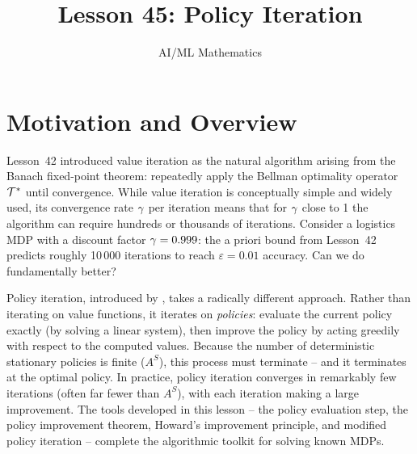 \documentclass[11pt,a4paper]{article}
\title{Lesson 45: Policy Iteration}
\author{AI/ML Mathematics}
\date{}
\begin{document}
\maketitle
\tableofcontents
\newpage


\section{Motivation and Overview}
\label{sec:motivation}

Lesson~42 introduced value iteration as the natural algorithm arising
from the Banach fixed-point theorem: repeatedly apply the Bellman
optimality operator $\mathcal{T}^*$ until convergence. While value
iteration is conceptually simple and widely used, its convergence rate
$\gamma$ per iteration means that for $\gamma$ close to 1 the
algorithm can require hundreds or thousands of iterations. Consider a
logistics MDP with a discount factor $\gamma = 0.999$: the a priori
bound from Lesson~42 predicts roughly 10\,000 iterations to reach
$\varepsilon = 0.01$ accuracy. Can we do fundamentally better?

Policy iteration, introduced by \citet{howard1960}, takes a
radically different approach. Rather than iterating on value functions,
it iterates on \emph{policies}: evaluate the current policy exactly
(by solving a linear system), then improve the policy by acting
greedily with respect to the computed values. Because the number of
deterministic stationary policies is finite ($A^S$), this process must
terminate -- and it terminates at the optimal policy. In practice,
policy iteration converges in remarkably few iterations (often far
fewer than $A^S$), with each iteration making a large improvement.
The tools developed in this lesson -- the policy evaluation step,
the policy improvement theorem, Howard's improvement principle, and
modified policy iteration -- complete the algorithmic toolkit for
solving known MDPs.
\end{document}
